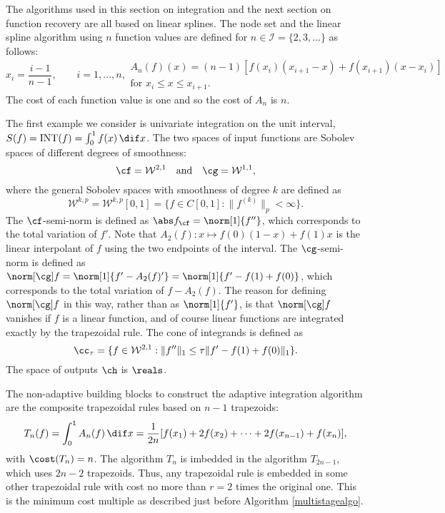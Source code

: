 The algorithms used in this section on integration and the next section on function recovery are all based on linear splines.  The node set and the linear spline algorithm using $n$ function values are defined for $n \in \mathcal{I}=\{2,3,\ldots\}$ as follows:
\begin{subequations} \label{linearspline}
\begin{equation}
x_i=\frac{i-1}{n-1}, \qquad i=1, \ldots, n,
\end{equation}
\begin{multline}
A_{n}(f)(x)=(n-1) \left[ f(x_{i})(x_{i+1}-x) +f(x_{i+1})(x-x_i) \right] \\ \text{for }x_i \leq x \leq x_{i+1}.
\end{multline}
\end{subequations}
The cost of each function value is one and so the cost of  $A_n$ is $n$.

The first example we consider is univariate integration on the unit interval, $S(f)=\INT(f)=\int_{0}^{1}f(x) \, \dif x$.  The two spaces of input functions are Sobolev spaces of different degrees of smoothness:
\begin{equation*}
  \cf=\mathcal{W}^{2,1} \quad \text{and} \quad
  \cg=\mathcal{W}^{1,1},
\end{equation*}
where the general Sobolev spaces with smoothness of degree $k$ are defined as 
\begin{equation} \label{defSobolev}
  \mathcal{W}^{k,p}=\mathcal{W}^{k,p}[0,1]=\{f\in C[0,1]: \|f^{(k)}\|_{p}<\infty\}.
\end{equation}
The $\cf$-semi-norm is defined as $\Fnorm{f}=\norm[1]{f''}$, which corresponds to the total variation of $f'$.  Note that $A_2(f): x \mapsto f(0)(1-x)+f(1)x$ is the linear interpolant of $f$ using the two endpoints of the interval.  The $\cg$-semi-norm is defined as $\Gnorm{f}=\norm[1]{f'-A_2(f)'}=\norm[1]{f'-f(1)+f(0)}$, which corresponds to the total variation of $f-A_2(f)$.  The reason for defining $\Gnorm{f}$ in this way, rather than as $\norm[1]{f'}$, is that $\Gnorm{f}$ vanishes if $f$ is a linear function, and of course linear functions are integrated exactly by the trapezoidal rule.  The cone of integrands is defined as  
\begin{equation}\label{coneinteg}
\cc_{\tau}=\{f\in \mathcal{W}^{2,1}:\|f''\|_1\leq\tau\|f'-f(1)+f(0)\|_1\}.
\end{equation}
The space of outputs $\ch$ is $\reals$.

The non-adaptive building blocks to construct the adaptive integration algorithm are the composite trapezoidal rules based on $n-1$ trapezoids:
\begin{equation*}
    T_{n}(f) = \int_0^1 A_n(f) \, \dif x 
    =\frac{1}{2n}[f(x_1)+2f(x_2)+\cdots+2f(x_{n-1})+f(x_n)],
\end{equation*}
with $\cost(T_n)=n$.  The algorithm $T_n$ is imbedded in the algorithm $T_{2n-1}$, which uses $2n-2$ trapezoids.  Thus, any trapezoidal rule is embedded in some other trapezoidal rule with cost no more than $r=2$ times the original one.  This is the minimum cost multiple as described just before Algorithm \ref{multistagealgo}.  

